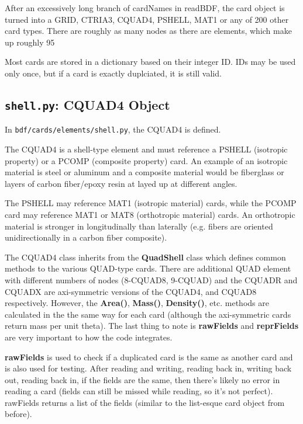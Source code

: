      After an excessively long branch of cardNames in readBDF, the card object is turned into a GRID, CTRIA3, CQUAD4, PSHELL, MAT1 or any of 200 other card types.  There are roughly as many nodes as there are elements, which make up roughly 95%
   
     Most cards are stored in a dictionary based on their integer ID.  IDs may be used only once, but if a card is exactly duplciated, it is still valid.

 \subsection{{\tt shell.py}: CQUAD4 Object}
     In {\tt bdf/cards/elements/shell.py}, the CQUAD4 is defined.
     
     The CQUAD4 is a shell-type element and must reference a PSHELL (isotropic property) or a PCOMP (composite property) card.  An example of an isotropic material is steel or aluminum and a composite material would be fiberglass or layers of carbon fiber/epoxy resin at layed up at different angles.
     
     The PSHELL may reference MAT1 (isotropic material) cards, while the PCOMP card may reference MAT1 or MAT8 (orthotropic material) cards.  An orthotropic material is stronger in longitudinally than laterally (e.g. fibers are oriented unidirectionally in a carbon fiber composite).
     
     The CQUAD4 class inherits from the {\bf QuadShell} class which defines common methods to the various QUAD-type cards.  There are additional QUAD element with different numbers of nodes (8-CQUAD8, 9-CQUAD) and the CQUADR and CQUADX are axi-symmetric versions of the CQUAD4, and CQUAD8 respectively.  However, the {\bf Area()}, {\bf Mass()}, {\bf Density()}, etc. methods are calculated in the the same way for each card (although the axi-symmetric cards return mass per unit theta).  The last thing to note is {\bf rawFields} and {\bf reprFields} are very important to how the code integrates.
     
     {\bf rawFields} is used to check if a duplicated card is the same as another card and is also used for testing.  After reading and writing, reading back in, writing back out, reading back in, if the fields are the 
     same, then there's likely no error in reading a card (fields can still be missed while reading, so it's not perfect).  rawFields returns a list of the fields (similar to the list-esque card object from before).
     

